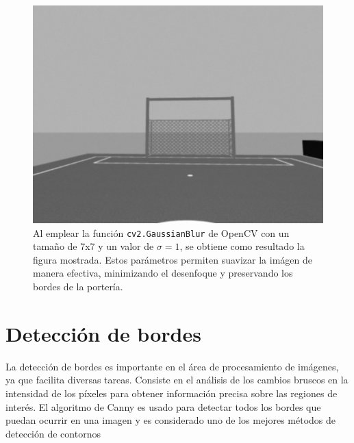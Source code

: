 \begin{figure}[H]
\begin{minipage}[b]{0.5\linewidth}
		\includegraphics[width=\linewidth]{images/gaussianfilter.jpg}
	\end{minipage}%
	\hspace{1em}
	\begin{minipage}[b]{0.4\linewidth}
		\caption{Al emplear la función \texttt{cv2.GaussianBlur} de OpenCV con un tamaño de 7x7 y un valor de $\sigma=1$, se obtiene como resultado la figura mostrada. Estos parámetros permiten suavizar la imágen de manera efectiva, minimizando el desenfoque y preservando los bordes de la portería.}
	
	\end{minipage}
	\label{fig:sigma}
\end{figure}









\section{Detección de bordes}
La detección de bordes es importante en el área de procesamiento de imágenes, ya que facilita diversas tareas. Consiste en el análisis de los cambios bruscos en la intensidad de los píxeles para obtener información precisa sobre las regiones de interés.\cite{rebaza2007deteccion} El algoritmo de Canny es usado para detectar todos los bordes que puedan ocurrir en una imagen y es considerado uno de los mejores métodos de detección de contornos \\

